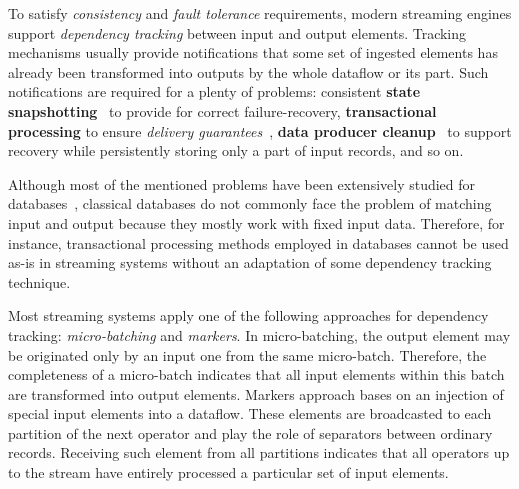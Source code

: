 \label {fs-acker-intro}




To satisfy {\em consistency} and {\em fault tolerance} requirements, modern streaming engines support {\em dependency tracking} between input and output elements. Tracking mechanisms usually provide notifications that some set of ingested elements has already been transformed into outputs by the whole dataflow or its part. Such notifications are required for a plenty of problems: consistent {\bf state snapshotting}~\cite{Akidau:2013:MFS:2536222.2536229, 2015arXiv150608603C} to provide for correct failure-recovery, {\bf transactional processing} to ensure {\em delivery guarantees}~\cite{thepaper, Carbone:2017:SMA:3137765.3137777}, {\bf data producer cleanup}~\cite{Noghabi:2017:SSS:3137765.3137770} to support recovery while persistently storing only a part of input records, and so on. 

Although most of the mentioned problems have been extensively studied for databases~\cite{DBLP:books/mk/WeikumV2002}, classical databases do not commonly face the problem of matching input and output because they mostly work with fixed input data. Therefore, for instance, transactional processing methods employed in databases cannot be used as-is in streaming systems without an adaptation of some dependency tracking technique.

Most streaming systems apply one of the following approaches for dependency tracking: {\em micro-batching} and {\em markers}. In micro-batching, the output element may be originated only by an input one from the same micro-batch. Therefore, the completeness of a micro-batch indicates that all input elements within this batch are transformed into output elements. Markers approach bases on an injection of special input elements into a dataflow. These elements are broadcasted to each partition of the next operator and play the role of separators between ordinary records. Receiving such element from all partitions indicates that all operators up to the stream have entirely processed a particular set of input elements. 

